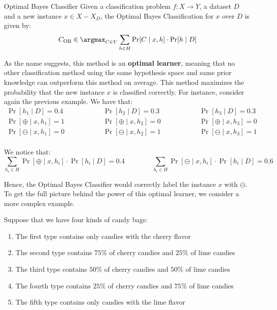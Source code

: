 \documentclass[a4paper, 12pt]{report}
\begin{document}
    \begin{frameddefn}{Optimal Bayes Classifier}
        Given a classification problem $f : X \to Y$, a dataset $D$ and a new instance $x \in X-X_D$, the Optimal Bayes Classification for $x$ over $D$ is given by:
        \[C_{\mathrm{OB}} \in \argmax_{C \in Y} \sum_{h \in H} \Pr[C \mid x, h] \cdot \Pr[h \mid D]\]
    \end{frameddefn}

    As the name suggests, this method is an \textbf{optimal learner}, meaning that no other classification method using the same hypothesis space and same prior knowledge can outperform this method on average. This method maximizes the probability that the new instance $x$ is classified correctly. For instance, consider again the previous example. We have that:
    \[\begin{array}{ccccc}
        \Pr[h_1 \mid D] = 0.4 & \qquad\qquad & \Pr[h_2 \mid D] = 0.3 & \qquad\qquad & \Pr[h_3 \mid D] = 0.3 \\
        \Pr[\oplus \mid x, h_1] = 1 & & \Pr[\oplus \mid x, h_2] = 0 & & \Pr[\oplus \mid x, h_3] = 0  \\
        \Pr[\ominus \mid x, h_1] = 0 & & \Pr[\ominus \mid x, h_2] = 1 & & \Pr[\ominus \mid x, h_3] = 1  \\
    \end{array}\]

    We notice that:
    \[\sum_{h_i \in H} \Pr[\oplus \mid x, h_i] \cdot \Pr[h_i \mid D] = 0.4 \qquad\qquad \sum_{h_i \in H} \Pr[\ominus \mid x, h_i] \cdot \Pr[h_i \mid D] = 0.6\]

    Hence, the Optimal Bayes Classifier would correctly label the instance $x$ with $\ominus$. To get the full picture behind the power of this optimal learner, we consider a more complex example.

    Suppose that we have four kinds of candy bags:
    \begin{enumerate}
        \item The first type contains only candies with the cherry flavor
        \item The second type contains $75\%$ of cherry candies and $25\%$ of lime candies
        \item The third type contains $50\%$ of cherry candies and $50\%$ of lime candies
        \item The fourth type contains $25\%$ of cherry candies and $75\%$ of lime candies
        \item The fifth type contains only candies with the lime flavor
    \end{enumerate}
\end{document}

